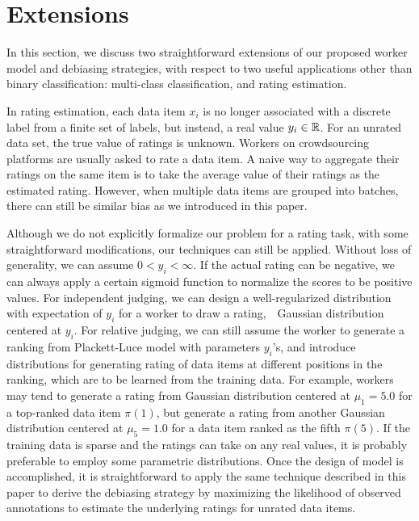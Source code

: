 
\section{Extensions}
\label{sec:ext}

In this section, we discuss two straightforward extensions of our proposed worker model and debiasing strategies, 
with respect to two useful applications other than binary classification: 
multi-class classification, and rating estimation.  

In rating estimation,%
each data item $x_i$ is no longer associated with a discrete label
from a finite set of labels, 
but instead, a real value $y_i \in {\mathbb{R}}$.  
For an unrated data set, the true value of ratings is unknown.  
Workers on crowdsourcing platforms are usually asked to rate a data item.  
A naive way to aggregate their ratings on the same item 
is to take the average value of their ratings as the estimated rating.  
However, when multiple data items are grouped into batches, 
there can still be similar bias as we introduced in this paper.

Although we do not explicitly formalize our problem for a rating task, 
with some straightforward modifications, 
our techniques can still be applied.  
Without loss of generality, we can assume $0 < y_i < \infty$.  
If the actual rating can be negative, 
we can always apply a certain sigmoid function to normalize the scores to be positive values.  
For independent judging, we can design a well-regularized distribution with expectation of $y_i$ 
for a worker to draw a rating,~\eg~Gaussian distribution centered at $y_i$.  
For relative judging, we can still assume the worker to generate a ranking from Plackett-Luce model with parameters $y_i$'s, 
and introduce distributions for generating rating of data items at different positions in the ranking, 
which are to be learned from the training data.  
For example, workers may tend to generate a rating from Gaussian distribution centered at $\mu_1=5.0$ for a top-ranked data item $\pi(1)$, 
but generate a rating from another Gaussian distribution centered at $\mu_5=1.0$ for a data item ranked as the fifth $\pi(5)$.  
If the training data is sparse and the ratings can take on any real values, 
it is probably preferable to employ some parametric distributions.    
Once the design of model is accomplished, 
it is straightforward to apply the same technique described in this paper 
to derive the debiasing strategy by maximizing the likelihood of observed annotations 
to estimate the underlying ratings for unrated data items.  


